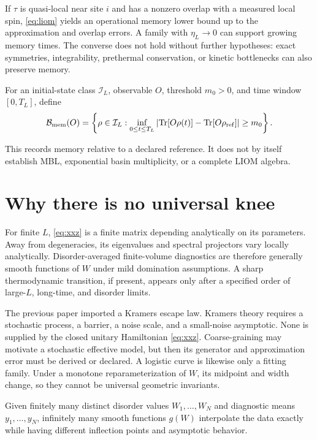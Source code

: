 \documentclass[11pt]{article}
\DeclareMathOperator{\Tr}{Tr}
\begin{document}
If $\tau$ is quasi-local near site $i$ and has a nonzero overlap with a
measured local spin, \cref{eq:liom} yields an operational memory lower
bound up to the approximation and overlap errors.  A family with
$\eta_L\to0$ can support growing memory times.  The converse does not
hold without further hypotheses: exact symmetries, integrability,
prethermal conservation, or kinetic bottlenecks can also preserve
memory.

\begin{definition}\label{def:memory-basin}
For an initial-state class $\mathcal I_L$, observable $O$, threshold
$m_0>0$, and time window $[0,T_L]$, define
\[
\mathcal B_{\rm mem}(O)=
\left\{\rho\in\mathcal I_L:
\inf_{0\leq t\leq T_L}
\left|\Tr[O\rho(t)]-\Tr[O\rho_{\rm ref}]\right|\geq m_0
\right\}.
\]
\end{definition}

This records memory relative to a declared reference.  It does not by
itself establish MBL, exponential basin multiplicity, or a complete
LIOM algebra.

\section{Why there is no universal knee}

For finite $L$, \cref{eq:xxz} is a finite matrix depending analytically
on its parameters.  Away from degeneracies, its eigenvalues and spectral
projectors vary locally analytically.  Disorder-averaged finite-volume
diagnostics are therefore generally smooth functions of $W$ under mild
domination assumptions.  A sharp thermodynamic transition, if present,
appears only after a specified order of large-$L$, long-time, and
disorder limits.

The previous paper imported a Kramers escape law.  Kramers theory
requires a stochastic process, a barrier, a noise scale, and a
small-noise asymptotic.  None is supplied by the closed unitary
Hamiltonian \cref{eq:xxz}.  Coarse-graining may motivate a stochastic
effective model, but then its generator and approximation error must be
derived or declared.  A logistic curve is likewise only a fitting
family.  Under a monotone reparameterization of $W$, its midpoint and
width change, so they cannot be universal geometric invariants.

\begin{proposition}
\label{prop:interpolation}
Given finitely many distinct disorder values $W_1,\ldots,W_N$ and
diagnostic means $y_1,\ldots,y_N$, infinitely many smooth functions
$g(W)$ interpolate the data exactly while having different inflection
points and asymptotic behavior.
\end{proposition}
\end{document}
